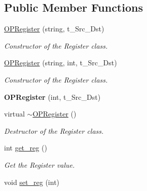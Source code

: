 \subsection*{Public Member Functions}
\begin{DoxyCompactItemize}
\item 
\hypertarget{classOPRegister_a896eb65f36bf615ccfa74541de23858f}{
\hyperlink{classOPRegister_a896eb65f36bf615ccfa74541de23858f}{OPRegister} (string, t\_\-Src\_\-Dst)}
\label{classOPRegister_a896eb65f36bf615ccfa74541de23858f}

\begin{DoxyCompactList}\small\item\em Constructor of the Register class. \item\end{DoxyCompactList}\item 
\hypertarget{classOPRegister_ad75c23d1db7c149c20cbc8bb01c6df59}{
\hyperlink{classOPRegister_ad75c23d1db7c149c20cbc8bb01c6df59}{OPRegister} (string, int, t\_\-Src\_\-Dst)}
\label{classOPRegister_ad75c23d1db7c149c20cbc8bb01c6df59}

\begin{DoxyCompactList}\small\item\em Constructor of the Register class. \item\end{DoxyCompactList}\item 
\hypertarget{classOPRegister_a3c9786680764ada47370d469790b8178}{
{\bfseries OPRegister} (int, t\_\-Src\_\-Dst)}
\label{classOPRegister_a3c9786680764ada47370d469790b8178}

\item 
\hypertarget{classOPRegister_aedab3bc5a2eecd0d02771fb6b37d73fe}{
virtual \hyperlink{classOPRegister_aedab3bc5a2eecd0d02771fb6b37d73fe}{$\sim$OPRegister} ()}
\label{classOPRegister_aedab3bc5a2eecd0d02771fb6b37d73fe}

\begin{DoxyCompactList}\small\item\em Destructor of the Register class. \item\end{DoxyCompactList}\item 
int \hyperlink{classOPRegister_a2e42d6407677a7be154a5d4d74f7a8e7}{get\_\-reg} ()
\begin{DoxyCompactList}\small\item\em Get the Register value. \item\end{DoxyCompactList}\item 
\hypertarget{classOPRegister_ab514f45a9957e9b485fee38f264a70cf}{
void \hyperlink{classOPRegister_ab514f45a9957e9b485fee38f264a70cf}{set\_\-reg} (int)}
\label{classOPRegister_ab514f45a9957e9b485fee38f264a70cf}


\end{DoxyCompactItemize}
